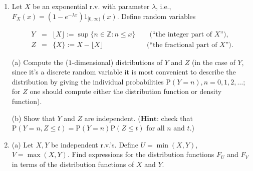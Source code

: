 \documentclass[11pt]{report}
\theoremstyle{plain}
\theoremstyle{definition}
\begin{document}
\begin{enumerate}[label=\arabic*.]
For any $n\in \mathbb{N}$ and $a_1, a_2, \ldots, a_n \in \{0,1\}$,
denote by $B_n(a_1,\ldots,a_n)$ the set

\[
B_n(a_1,\ldots,a_n) = \{ x \in (0,1) : R_1(x)=a_1, R_2(x)=a_2, \ldots, R_n(x) = a_n \}.
\]

Find a good explicit description for this set (``the set of all $x$'s such that ...''), and deduce from it that

\[
\mathrm{P}(B_n(a_1,\ldots,a_n)) = \frac{1}{2^n}.
\]

(c) Define a function $f:(0,1) \to \{0,1\}^{\mathbb{N}}$ by

\[
f(x) = (R_1(x), R_2(x), R_3(x), \ldots).
\]

Prove that $f$ is a measurable function when the space $\{0,1\}^{\mathbb{N}}$ is equipped with the $\sigma$-algebra generated by the sets

\[
A_n(1) = \{ (x_1,x_2,\ldots) \in \{0,1\}^{\mathbb{N}} : x_n = 1 \}.
\]

(d) Prove that the push-forward of Lebesgue measure under $f$ is the probability measure corresponding to the random experiment of an infinite sequence of fair coin tosses.
\item Let $X$ be an exponential r.v. with parameter $\lambda$, i.e., $F_X(x)=(1-e^{-\lambda x}) 1_{[0,\infty)}(x)$. Define random variables

\begin{eqnarray*}
Y &=& \lfloor X \rfloor := \sup \{ n\in \mathbb{Z} : n \le x \} \qquad\textrm{(``the integer part of $X$'')}, \\
Z &=& \{ X \} := X-\lfloor X \rfloor \qquad \qquad\ \qquad\textrm{(``the fractional part of $X$'')}.
\end{eqnarray*}

(a) Compute the ($1$-dimensional) distributions of $Y$ and $Z$ (in the case of $Y$, since it's a discrete random variable it is most convenient to describe the distribution by giving the individual probabilities $\mathrm{P}(Y=n), n=0,1,2,\ldots$; for $Z$ one should compute either the distribution function or density function).

(b) Show that $Y$ and $Z$ are independent. ($\textbf{Hint:}$ check that $\mathrm{P}(Y=n, Z\le t)=\mathrm{P}(Y=n)\mathrm{P}(Z\le t)$ for all $n$ and $t$.)
\item (a) Let $X, Y$ be independent r.v.'s. Define $U=\min(X,Y)$, $V=\max(X,Y)$. Find expressions for the distribution functions $F_U$ and $F_V$ in terms of the distribution functions of $X$ and $Y$.


\end{enumerate}
\end{document}
